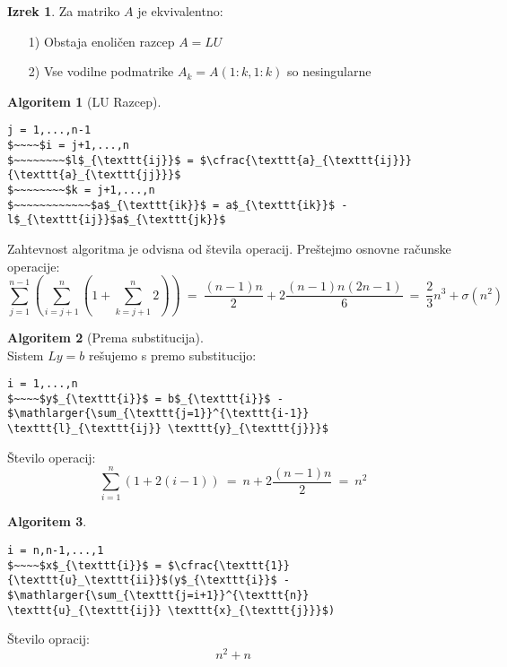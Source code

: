 \documentclass[11pt]{article}
\theoremstyle{definition}
\newtheorem{izrek}{Izrek}
\newtheorem*{algoritem}{Algoritem}
\begin{document}
\begin{izrek}

Za matriko $A$ je ekvivalentno:
\begin{enumerate}
	\item[1)] Obstaja enoličen razcep $A = LU$
	\item[2)] Vse vodilne podmatrike $A_k = A(1:k, 1:k)$ so nesingularne
\end{enumerate}

\end{izrek}
\vspace{0.5cm}

\begin{algoritem}[LU Razcep]
~
\begin{lstlisting}
j = 1,...,n-1
$~~~~$i = j+1,...,n
$~~~~~~~~$l$_{\texttt{ij}}$ = $\cfrac{\texttt{a}_{\texttt{ij}}}{\texttt{a}_{\texttt{jj}}}$
$~~~~~~~~$k = j+1,...,n
$~~~~~~~~~~~~$a$_{\texttt{ik}}$ = a$_{\texttt{ik}}$ - l$_{\texttt{ij}}$a$_{\texttt{jk}}$
\end{lstlisting}
Zahtevnost algoritma je odvisna od števila operacij. Preštejmo osnovne računske operacije:
$$\sum_{j=1}^{n-1} \left( \sum_{i=j+1}^n \left( 1 + \sum_{k=j+1}^n 2 \right) \right) ~=~ \frac{(n-1)n}{2} + 2 \frac{(n-1)n(2n-1)}{6} ~=~ \frac{2}{3}n^3 + \sigma(n^2)$$

\end{algoritem}
\vspace{0.5cm}

\begin{algoritem}[Prema substitucija]
~\\
Sistem $Ly = b$ rešujemo s premo substitucijo:
\begin{lstlisting}
i = 1,...,n
$~~~~$y$_{\texttt{i}}$ = b$_{\texttt{i}}$ - $\mathlarger{\sum_{\texttt{j=1}}^{\texttt{i-1}} \texttt{l}_{\texttt{ij}} \texttt{y}_{\texttt{j}}}$
\end{lstlisting}
Število operacij:
$$\sum_{i=1}^n (1 + 2(i-1)) ~=~ n + 2\frac{(n-1)n}{2} ~=~ n^2$$

\end{algoritem}
\vspace{0.5cm}

\begin{algoritem}
~
\begin{lstlisting}
i = n,n-1,...,1
$~~~~$x$_{\texttt{i}}$ = $\cfrac{\texttt{1}}{\texttt{u}_\texttt{ii}}$(y$_{\texttt{i}}$ - $\mathlarger{\sum_{\texttt{j=i+1}}^{\texttt{n}} \texttt{u}_{\texttt{ij}} \texttt{x}_{\texttt{j}}}$)
\end{lstlisting}
Število opracij:
$$n^2 + n$$

\end{algoritem}
\vspace{0.5cm}


\pagebreak

\end{document}
